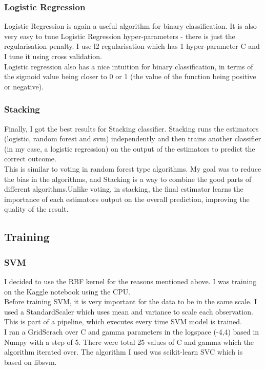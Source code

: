 \documentclass[12pt]{article}
\theoremstyle{definition}
\begin{document}
\subsubsection{Logistic Regression}
Logistic Regression is again a useful algorithm for binary classification. It is also very easy to tune Logistic Regression hyper-parameters - there is just the regularisation penalty. I use l2 regularisation which has 1 hyper-parameter C and I tune it using cross validation.\\

Logistic regression also has a nice intuition for binary classification, in terms of the sigmoid value being closer to 0 or 1 (the value of the function being positive or negative).  
\subsubsection{Stacking}
Finally, I got the best results for Stacking classifier. Stacking runs the estimators (logistic, random forest and svm) independently and then trains another classifier (in my case, a logistic regression) on the output of the estimators to predict the correct outcome. \\

This is similar to voting in random forest type algorithms. My goal was to reduce the bias in the algorithms, and Stacking is a way to combine the good parts of different algorithms.Unlike voting, in stacking, the final estimator learns the importance of each estimators output on the overall prediction, improving the quality of the result. 


\subsection{Training}
\subsubsection{SVM}
I decided to use the RBF kernel for the reasons mentioned above. I was training on the Kaggle notebook using the CPU.\\

Before training SVM, it is very important for the data to be in the same scale. I used a StandardScaler which uses mean and variance to scale each observation. This is part of a pipeline, which executes every time SVM model is trained. \\

I ran a GridSerach over C and gamma parameters in the logspace (-4,4) based in Numpy \cite{numpy} with a step of 5. There were total 25 values of C and gamma which the algorithm iterated over. The algorithm I used was scikit-learn \cite{scikit-learn} SVC which is based on libsvm. \\
\end{document}
